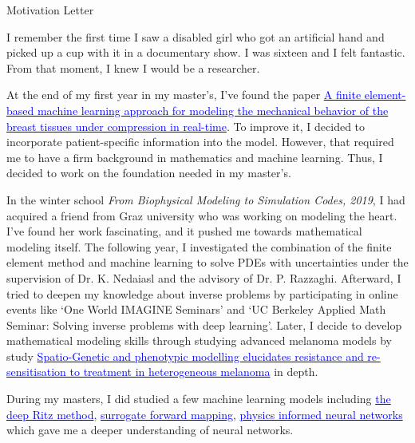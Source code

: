 \begin{cSection}{Motivation Letter}
	\small

I remember the first time I saw a disabled girl who got an artificial hand and picked up a cup with it in a documentary show. I was sixteen and I felt fantastic. From that moment, I knew I would be a researcher.

At the end of my first year in my master's, I've found the paper \href{https://pubmed.ncbi.nlm.nih.gov/28982035/}{\textcolor{blue}{A finite element-based machine learning approach for modeling the mechanical behavior of the breast tissues under compression in real-time}}. To improve it, I decided to incorporate patient-specific information into the model. However, that required me to have a firm background in mathematics and machine learning. Thus, I decided to work on the foundation needed in my master's.

In the winter school \textit{From Biophysical Modeling to Simulation Codes, 2019}, I had acquired a friend from Graz university who was working on modeling the heart. I've found her work fascinating, and it pushed me towards mathematical modeling itself. The following year, I investigated the combination of the finite element method and machine learning to solve PDEs with uncertainties under the supervision of Dr. K. Nedaiasl and the advisory of Dr. P. Razzaghi. Afterward, I tried to deepen my knowledge about inverse problems by participating in online events like `One World IMAGINE Seminars' and `UC Berkeley Applied Math Seminar: Solving inverse problems with deep learning'. Later, I decide to develop mathematical modeling skills through studying advanced melanoma models by study \href{https://www.sciencedirect.com/science/article/abs/pii/S0022519318305903}{\textcolor{blue}{Spatio-Genetic and phenotypic modelling elucidates resistance and re-sensitisation to treatment in heterogeneous melanoma}} in depth. 

During my masters,  I did studied a few machine learning models including \href{https://link.springer.com/article/10.1007/s40304-018-0127-z#:~:text=We%20propose%20a%20deep%20learning,work%20in%20rather%20high%20dimensions.}{\textcolor{blue}{ the deep Ritz method}}, \href{https://www.semanticscholar.org/paper/Solving-PDE-problems-with-uncertainty-using-Khoo-Lu/ffacc17153bf122cc8a726adca6b468cd5fecb54}{\textcolor{blue}{surrogate forward mapping}}, \href{https://maziarraissi.github.io/research/1_physics_informed_neural_networks/}{\textcolor{blue}{physics informed neural networks}} which gave me a deeper understanding of neural networks.
	

\end{cSection}
